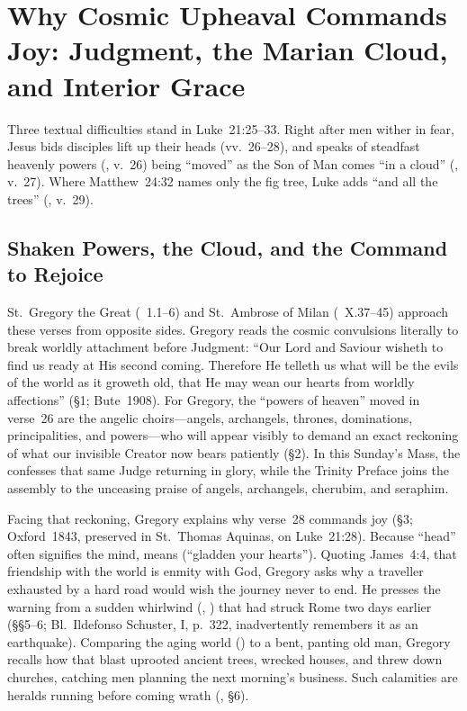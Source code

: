 \section{Why Cosmic Upheaval Commands Joy: Judgment, the Marian Cloud, and Interior Grace}

Three textual difficulties stand in Luke~21:25--33. Right after men wither in fear, Jesus bids disciples lift up their heads (vv.~26--28), and speaks of steadfast heavenly powers (, v.~26) being ``moved'' as the Son of Man comes ``in a cloud'' (, v.~27). Where Matthew~24:32 names only the fig tree, Luke adds ``and all the trees'' (, v.~29).

\subsection{Shaken Powers, the Cloud, and the Command to Rejoice}

St.~Gregory the Great (~1.1--6) and St.~Ambrose of Milan (~X.37--45) approach these verses from opposite sides. Gregory reads the cosmic convulsions literally to break worldly attachment before Judgment: ``Our Lord and Saviour wisheth to find us ready at His second coming. Therefore He telleth us what will be the evils of the world as it groweth old, that He may wean our hearts from worldly affections'' (\S1; Bute~1908). For Gregory, the ``powers of heaven'' moved in verse~26 are the angelic choirs---angels, archangels, thrones, dominations, principalities, and powers---who will appear visibly to demand an exact reckoning of what our invisible Creator now bears patiently (\S2). In this Sunday's Mass, the  confesses that same Judge returning in glory, while the Trinity Preface joins the assembly to the unceasing praise of angels, archangels, cherubim, and seraphim.

Facing that reckoning, Gregory explains why verse~28 commands joy (\S3; Oxford~1843, preserved in St.~Thomas Aquinas,  on Luke~21:28). Because ``head'' often signifies the mind,  means  (``gladden your hearts''). Quoting James~4:4, that friendship with the world is enmity with God, Gregory asks why a traveller exhausted by a hard road would wish the journey never to end. He presses the warning from a sudden whirlwind (, ) that had struck Rome two days earlier (\S\S5--6; Bl.~Ildefonso Schuster, I, p.~322, inadvertently remembers it as an earthquake). Comparing the aging world () to a bent, panting old man, Gregory recalls how that blast uprooted ancient trees, wrecked houses, and threw down churches, catching men planning the next morning's business. Such calamities are heralds running before coming wrath (, \S6).

